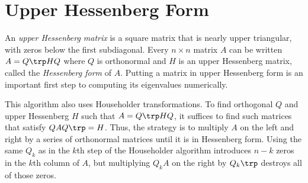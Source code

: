 
\section*{Upper Hessenberg Form} %

An \emph{upper Hessenberg matrix} is a square matrix that is nearly upper triangular, with zeros below the first subdiagonal.
Every $n \times n$ matrix $A$ can be written $A = Q\trp HQ$ where $Q$ is orthonormal and $H$ is an upper Hessenberg matrix, called the \emph{Hessenberg form} of $A$.
Putting a matrix in upper Hessenberg form is an important first step to computing its eigenvalues numerically.


This algorithm also uses Householder transformations.
To find orthogonal $Q$ and upper Hessenberg $H$ such that $A = Q\trp HQ$, it suffices to find such matrices that satisfy $Q A Q\trp = H$.
Thus, the strategy is to multiply $A$ on the left and right by a series of orthonormal matrices until it is in Hessenberg form.
Using the same $Q_k$ as in the $k$th step of the Householder algorithm introduces $n - k$ zeros in the $k$th column of $A$, but multiplying $Q_k A$ on the right by $Q_k\trp$ destroys all of those zeros.

